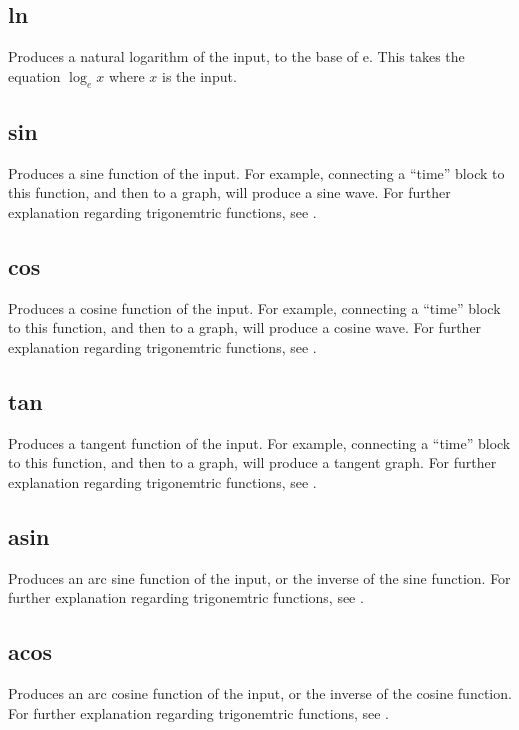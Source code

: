 \subsection{ln}\label{Operation:ln} Produces a natural logarithm of the input, to the base of e.
This takes the equation $\log_{e} x$ where $x$ is the input.

\subsection{sin}\label{Operation:sin} Produces a sine function of the input. For example, 
connecting a ``time'' block to this function, and then to a graph,
will produce a sine wave.  For further explanation regarding
trigonemtric functions, see .

\subsection{cos}\label{Operation:cos} Produces a cosine function of the input. For example, 
connecting a ``time'' block to this function, and then to a graph,
will produce a cosine wave.  For further explanation regarding
trigonemtric functions, see .

\subsection{tan}\label{Operation:tan} Produces a tangent function of the input. For example, 
connecting a ``time'' block to this function, and then to a graph,
will produce a tangent graph.  For further explanation regarding
trigonemtric functions, see .

\subsection{asin}\label{Operation:asin} Produces an arc sine function of the input, 
or the inverse of the sine function. For further explanation regarding
trigonemtric functions, see .

\subsection{acos}\label{Operation:acos} Produces an arc cosine function of the input, 
or the inverse of the cosine function. For further explanation
regarding trigonemtric functions, see .

